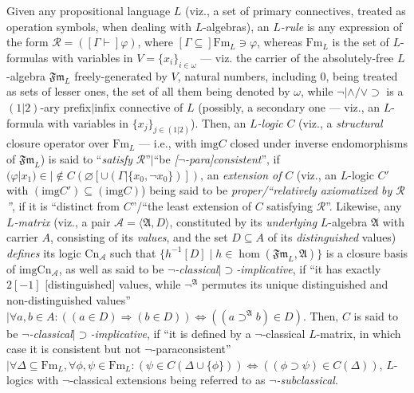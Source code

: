 \documentclass[bsl,meeting]{asl}
\newcommand{\NP}{}
\newcommand{\mf}[1]{\mathfrak{#1}}
\newcommand{\mc}[1]{\mathcal{#1}}
\newcommand{\ms}[1]{\mathscr{#1}}
\newcommand{\couple}[2]{\langle{#1},{#2}\rangle}
\newcommand{\FA}{\mathfrak{Fm}}
\newcommand{\inverse}[1]{{#1}^{-1}}
\def\iff{\Leftrightarrow}
\newcommand{\Fm}{\mathrm{Fm}}
\newcommand{\img}{\mathrm{img}}
\newcommand{\Cn}{\mathrm{Cn}}
\begin{document}
\thispagestyle{empty}


\NP
{}



Given any propositional language $L$
(viz., a set of primary connectives,
treated as operation symbols, when dealing
with $L$-algebras), an {\em $L$-rule\/}
is any expression of the form $\ms{R}=([\Gamma\vdash]\varphi)$,
where $[\Gamma\subseteq]\Fm_L\ni\varphi$,
whereas $\Fm_L$ is the set of $L$-formulas
with variables in %
$V=\{x_i\}_{i\in\omega}$ --- viz.
the carrier of the absolutely-free $L$-algebra $\FA_L$
freely-generated by $V$,
natural numbers, including $0$,
being treated as sets of lesser ones,
the set of all them being denoted by $\omega$,
while $\neg|\land/\lor\supset$ is a
$(1|2)$-ary prefix$|$infix connective of $L$
(possibly, a secondary one --- viz., an $L$-formula
with variables in $\{x_j\}_{j\in(1|2)}$).
Then, an {\em $L$-logic\/} $C$ (viz.,
a {\em structural\/} closure operator over $\Fm_L$
--- i.e., with $\img C$ closed under inverse
endomorphisms of $\FA_L$)
is said to ``{\em satisfy\/} $\ms{R}$''$|$``be {\em [$\neg$-para]consistent\/}'',
if $(\varphi|x_1)\in|\not\in C(\varnothing[\cup(\Gamma|\{x_0,\neg x_0\})])$,
an {\em extension of\/} $C$ (viz., an $L$-logic $C'$ with $(\img C')\subseteq(\img
C)$)
being said to be {\em proper/``relatively axiomatized
by\/ $\ms{R}$''}, if it is ``distinct from $C$''/``the least
extension of $C$ satisfying $\ms{R}$''.
Likewise, any {\em $L$-matrix\/}
(viz., a pair $\mc{A}=\couple{\mf{A}}{D}$,
constituted by its {\em underlying\/} $L$-algebra $\mf{A}$ with
carrier $A$, consisting of its {\em values}, and the set $D\subseteq A$  of
its {\em distinguished\/} values) {\em defines\/} its logic
$\Cn_{\mc{A}}$ such that
$\{\inverse{h}[D]\mid h\in\hom(\FA_L,\mf{A})\}$
is a closure basis of %
$\img\Cn_{\mc{A}}$, %
as well as said to be {\em
$\neg$-classical\/$|\supset$-implicative},
if ``it has exactly $2[-1]$ [distinguished] values,
while $\neg^{\mf{A}}$ permutes its unique distinguished
and non-distinguished values''$|\forall a,b\in A:
((a\in D)\Rightarrow(b\in
D))\iff((a\supset^{\mf{A}}b)\in D)$.
Then, $C$ is said to be {\em $\neg$-classical\/$|\supset$-implicative},
if ``it %
is defined by
a $\neg$-classical $L$-matrix,
in which case it is consistent but not $\neg$-paraconsistent''$|\forall\Delta\subseteq\Fm_L,\forall\phi,\psi\in\Fm_L:
(\psi\in C(\Delta\cup\{\phi\}))\iff((\phi\supset\psi)\in
C(\Delta))$,
$L$-logics with $\neg$-classical extensions being referred to as
{\em $\neg$-subclassical}.
\end{document}
